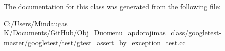 The documentation for this class was generated from the following file\+:\begin{DoxyCompactItemize}
\item 
C\+:/\+Users/\+Mindaugas K/\+Documents/\+Git\+Hub/\+Obj\+\_\+\+Duomenu\+\_\+apdorojimas\+\_\+class/googletest-\/master/googletest/test/\mbox{\hyperlink{googletest-master_2googletest_2test_2gtest__assert__by__exception__test_8cc}{gtest\+\_\+assert\+\_\+by\+\_\+exception\+\_\+test.\+cc}}\end{DoxyCompactItemize}
